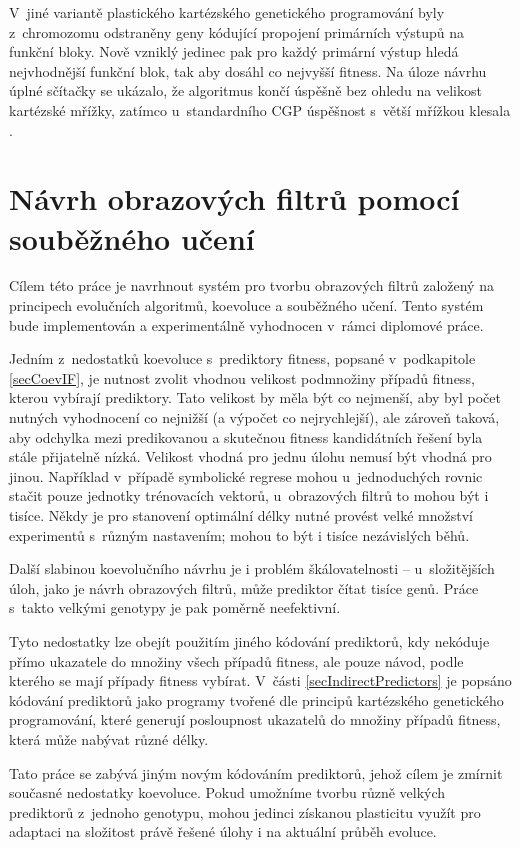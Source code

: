 V~jiné variantě plastického kartézského genetického programování byly z~chromozomu odstraněny geny kódující  propojení primárních výstupů na funkční bloky. Nově vzniklý jedinec pak pro každý primární výstup hledá nejvhodnější funkční blok, tak aby dosáhl co nejvyšší fitness. Na úloze návrhu úplné sčítačky se ukázalo, že algoritmus končí úspěšně bez ohledu na velikost kartézské mřížky, zatímco u~standardního CGP úspěšnost s~větší mřížkou klesala \cite{KhatirPlasticCGP}.

\chapter{Návrh obrazových filtrů pomocí souběžného učení}
\label{chDesign}

Cílem této práce je navrhnout systém pro tvorbu obrazových filtrů založený na principech evolučních algoritmů, koevoluce a souběžného učení. Tento systém bude implementován a experimentálně vyhodnocen v~rámci diplomové práce.

Jedním z~nedostatků koevoluce s~prediktory fitness, popsané v~podkapitole \ref{secCoevIF}, je nutnost zvolit vhodnou velikost podmnožiny případů fitness, kterou vybírají prediktory. Tato velikost by měla být co nejmenší, aby byl počet nutných vyhodnocení co nejnižší (a výpočet co nejrychlejší), ale zároveň taková, aby odchylka mezi predikovanou a skutečnou fitness kandidátních řešení byla stále přijatelně nízká. Velikost vhodná pro jednu úlohu nemusí být vhodná pro jinou. Například v~případě symbolické regrese mohou u~jednoduchých rovnic stačit pouze jednotky trénovacích vektorů, u~obrazových filtrů to mohou být i tisíce. Někdy je pro stanovení optimální délky nutné provést velké množství experimentů s~různým nastavením; mohou to být i tisíce nezávislých běhů.

Další slabinou koevolučního návrhu je i problém škálovatelnosti -- u~složitějších úloh, jako je návrh obrazových filtrů, může prediktor čítat tisíce genů. Práce s~takto velkými genotypy je pak poměrně neefektivní.

Tyto nedostatky lze obejít použitím jiného kódování prediktorů, kdy nekóduje přímo ukazatele do množiny všech případů fitness, ale pouze návod, podle kterého se mají případy fitness vybírat. V~části \ref{secIndirectPredictors} je popsáno kódování prediktorů jako programy tvořené dle principů kartézského genetického programování, které generují posloupnost ukazatelů do množiny případů fitness, která může nabývat různé délky.

Tato práce se zabývá jiným novým kódováním prediktorů, jehož cílem je zmírnit současné nedostatky koevoluce. Pokud umožníme tvorbu různě velkých prediktorů z~jednoho genotypu, mohou jedinci získanou plasticitu využít pro adaptaci na složitost právě řešené úlohy i na aktuální průběh evoluce.

